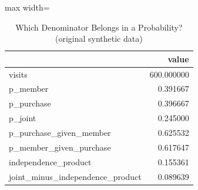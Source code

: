\begin{table}[htbp]
\centering
\caption{Which Denominator Belongs in a Probability? (original synthetic data)}
\begingroup
\small
\setlength{\tabcolsep}{6pt}
\renewcommand{\arraystretch}{1.12}
\begin{adjustbox}{max width=\linewidth}
\begin{tabular}{@{}lr@{}}
\toprule
 & value \\
\midrule
visits & 600.000000 \\
p\_member & 0.391667 \\
p\_purchase & 0.396667 \\
p\_joint & 0.245000 \\
p\_purchase\_given\_member & 0.625532 \\
p\_member\_given\_purchase & 0.617647 \\
independence\_product & 0.155361 \\
joint\_minus\_independence\_product & 0.089639 \\
\bottomrule
\end{tabular}
\end{adjustbox}
\endgroup
\end{table}